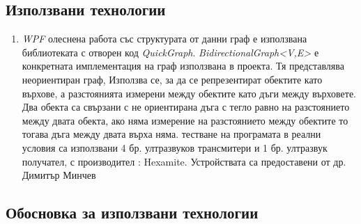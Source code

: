 \subsection{Използвани технологии}


\begin{enumerate}
  разработката на приложението е използвана интегрираната среда за разработка на софтуер \textit{Visual Studio 2017}. 
  програмен език е \textit{C Sharp}. 
  визуализацията на примитиви в 3D е използвана библиотеката с отворен код \textit{Helix Toolkit 3D}. Позволява достъп до вече настроен viewport, както и някои базови за работата с 3D обекти функции – ротация, транслация и скалиране.
 \item \textit{WPF} 
  олеснена работа със структурата от данни граф е използвана библиотеката с отворен код \textit{QuickGraph}. \textit{BidirectionalGraph<V,E>} е конкретната имплементация на граф използвана в проекта.  Тя представлява неориентиран граф, Използва се, за да се репрезентират обектите като върхове, а разстоянията измерени между обектите като дъги между върховете. Два обекта са свързани с не ориентирана дъга с тегло равно на разстоянието между двата обекта, ако няма измерение на разстоянието между обектите то тогава дъга между двата върха няма.
  тестване на програмата в реални условия са използвани 4 бр. ултразвуков трансмитери и 1 бр. ултразвук получател, с производител : Hexamite. Устройствата са предоставени от др. Димитър Минчев
\end{enumerate}

\subsection{Обосновка за използвани технологии}

